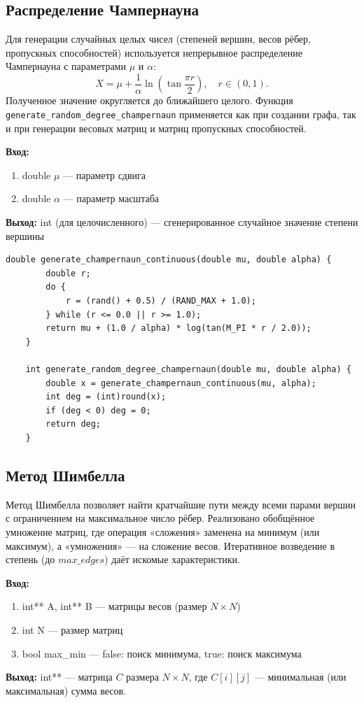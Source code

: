 \subsection{Распределение Чампернауна}
Для генерации случайных целых чисел (степеней вершин, весов рёбер, пропускных способностей) используется непрерывное распределение Чампернауна с параметрами $\mu$ и $\alpha$:
\[
X = \mu + \frac{1}{\alpha}\ln\left(\tan\frac{\pi r}{2}\right),\quad r \in (0,1).
\]
Полученное значение округляется до ближайшего целого. Функция \\ \texttt{generate\_random\_degree\_champernaun} применяется как при создании графа, так и при генерации весовых матриц и матриц пропускных способностей.

\noindent\textbf{Вход:}
\begin{enumerate}
	\item double $\mu$ — параметр сдвига
	\item double $\alpha$ — параметр масштаба
\end{enumerate}
\noindent\textbf{Выход:}
int (для целочисленного) — сгенерированное случайное значение степени вершины

\begin{lstlisting}[caption=Генерация по Чампернауну (generate\_graphs.cpp)]
	double generate_champernaun_continuous(double mu, double alpha) {
		double r;
		do {
			r = (rand() + 0.5) / (RAND_MAX + 1.0);
		} while (r <= 0.0 || r >= 1.0);
		return mu + (1.0 / alpha) * log(tan(M_PI * r / 2.0));
	}
	
	int generate_random_degree_champernaun(double mu, double alpha) {
		double x = generate_champernaun_continuous(mu, alpha);
		int deg = (int)round(x);
		if (deg < 0) deg = 0;
		return deg;
	}
\end{lstlisting}

\subsection{Метод Шимбелла}
Метод Шимбелла позволяет найти кратчайшие пути между всеми парами вершин с ограничением на максимальное число рёбер. Реализовано обобщённое умножение матриц, где операция «сложения» заменена на минимум (или максимум), а «умножения» — на сложение весов. Итеративное возведение в степень (до $max\_edges$) даёт искомые характеристики.

\noindent\textbf{Вход:}
\begin{enumerate}
	\item int** A, int** B — матрицы весов (размер $N \times N$)
	\item int N — размер матриц
	\item bool max\_min — false: поиск минимума, true: поиск максимума
\end{enumerate}
\noindent\textbf{Выход:}
int** — матрица $C$ размера $N \times N$, где $C[i][j]$ — минимальная (или максимальная) сумма весов.

